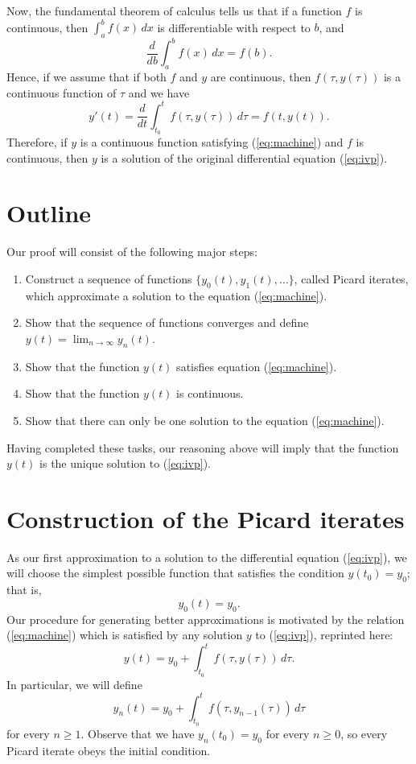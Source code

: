 \documentclass{myart}
\newcommand{\eq}[1]{(\ref{eq:#1})}
\begin{document}
Now, the fundamental theorem of calculus tells us that if a function $f$ is continuous, then $\int_a^b f(x)\,dx$ is differentiable with respect to $b$, and
\begin{equation*}
\frac{d}{db} \int_a^b f(x) \,dx = f(b).
\end{equation*}
Hence, if we assume that if both $f$ and $y$ are continuous, then $f(\tau, y(\tau))$ is a continuous function of $\tau$ and we have
\begin{equation*}
y'(t) = \frac{d}{dt} \int_{t_0}^t f(\tau, y(\tau)) \,d\tau = f(t, y(t)).
\end{equation*}
Therefore, if $y$ is a continuous function satisfying \eq{machine} and $f$ is continuous, then $y$ is a solution of the original differential equation \eq{ivp}.

\section{Outline}

Our proof will consist of the following major steps:
\begin{enumerate}[label=(\alph*)]
\item Construct a sequence of functions $\{y_0(t), y_1(t), \ldots\}$, called Picard iterates, which approximate a solution to the equation \eq{machine}.
\item Show that the sequence of functions converges and define $y(t) = \lim_{n \to \infty} y_n(t)$.
\item Show that the function $y(t)$ satisfies equation \eq{machine}.
\item Show that the function $y(t)$ is continuous.
\item Show that there can only be one solution to the equation \eq{machine}.
\end{enumerate}
Having completed these tasks, our reasoning above will imply that the function $y(t)$ is the unique solution to \eq{ivp}.

\section{Construction of the Picard iterates}

As our first approximation to a solution to the differential equation \eq{ivp}, we will choose the simplest possible function that satisfies the condition $y(t_0) = y_0$; that is,
\begin{equation*}
y_0(t) = y_0.
\end{equation*}
Our procedure for generating better approximations is motivated by the relation \eq{machine} which is satisfied by any solution $y$ to \eq{ivp}, reprinted here:
\begin{equation*}
y(t) = y_0 + \int_{t_0}^t f(\tau, y(\tau)) \,d\tau.
\end{equation*}
In particular, we will define
\begin{equation} \label{eq:picard}
y_n(t) = y_0 + \int_{t_0}^t f(\tau, y_{n-1}(\tau)) \,d\tau
\end{equation}
for every $n \geq 1$. Observe that we have $y_n(t_0) = y_0$ for every $n \geq 0$, so every Picard iterate obeys the initial condition.
\end{document}
